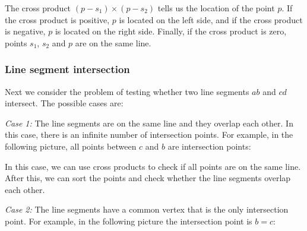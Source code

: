 The cross product $(p-s_1) \times (p-s_2)$
tells us the location of the point $p$.
If the cross product is positive,
$p$ is located on the left side,
and if the cross product is negative,
$p$ is located on the right side.
Finally, if the cross product is zero,
points $s_1$, $s_2$ and $p$ are on the same line.

\subsubsection{Line segment intersection}


Next we consider the problem of testing
whether two line segments
$ab$ and $cd$ intersect. The possible cases are:

\textit{Case 1:}
The line segments are on the same line
and they overlap each other.
In this case, there is an infinite number of
intersection points.
For example, in the following picture,
all points between $c$ and $b$ are
intersection points:
\begin{center}
\end{center}

In this case, we can use cross products to
check if all points are on the same line.
After this, we can sort the points and check
whether the line segments overlap each other.

\textit{Case 2:}
The line segments have a common vertex
that is the only intersection point.
For example, in the following picture the
intersection point is $b=c$:

\begin{center}
\end{center}

